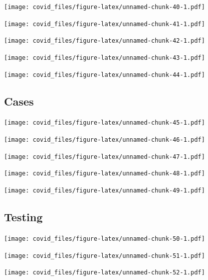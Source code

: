 \documentclass[]{article}
\begin{document}
\texttt{[image: covid\_files/figure-latex/unnamed-chunk-40-1.pdf]}

\texttt{[image: covid\_files/figure-latex/unnamed-chunk-41-1.pdf]}

\texttt{[image: covid\_files/figure-latex/unnamed-chunk-42-1.pdf]}

\texttt{[image: covid\_files/figure-latex/unnamed-chunk-43-1.pdf]}

\texttt{[image: covid\_files/figure-latex/unnamed-chunk-44-1.pdf]}

\newpage

\hypertarget{cases-2}{%
\subsection{Cases}\label{cases-2}}

\texttt{[image: covid\_files/figure-latex/unnamed-chunk-45-1.pdf]}

\texttt{[image: covid\_files/figure-latex/unnamed-chunk-46-1.pdf]}

\texttt{[image: covid\_files/figure-latex/unnamed-chunk-47-1.pdf]}

\texttt{[image: covid\_files/figure-latex/unnamed-chunk-48-1.pdf]}

\texttt{[image: covid\_files/figure-latex/unnamed-chunk-49-1.pdf]}

\newpage

\hypertarget{testing-2}{%
\subsection{Testing}\label{testing-2}}

\texttt{[image: covid\_files/figure-latex/unnamed-chunk-50-1.pdf]}

\texttt{[image: covid\_files/figure-latex/unnamed-chunk-51-1.pdf]}

\texttt{[image: covid\_files/figure-latex/unnamed-chunk-52-1.pdf]}
\end{document}
